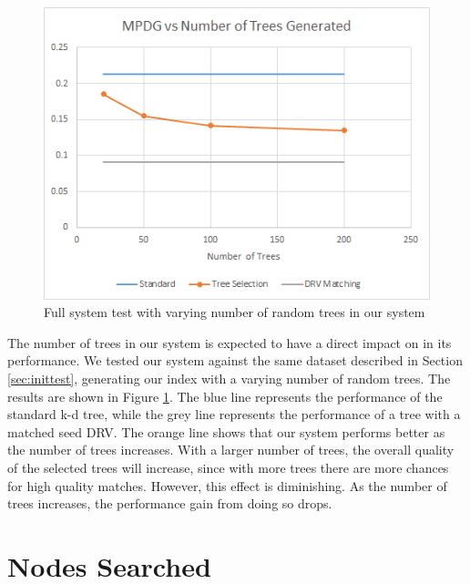 \begin{figure}[h]
\begin{center}
\includegraphics[width=.85\textwidth]{Figures/ntreesgen}
\end{center}
\caption{Full system test with varying number of random trees in our system}
\label{fig:ntreesgen}
\end{figure}

The number of trees in our system is expected to have a direct impact on in its performance.  We tested our system against the same dataset described in Section \ref{sec:inittest}, generating our index with a varying number of random trees.  The results are shown in Figure \ref{fig:ntreesgen}.  The blue line represents the performance of the standard k-d tree, while the grey line represents the performance of a tree with a matched seed DRV.  The orange line shows that our system performs better as the number of trees increases.  With a larger number of trees, the overall quality of the selected trees will increase, since with more trees there are more chances for high quality matches.  However, this effect is diminishing.  As the number of trees increases, the performance gain from doing so drops.

\section{Nodes Searched}

